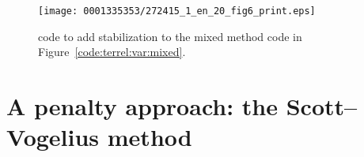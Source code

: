 \begin{figure}
\bwfig
\texttt{[image: 0001335353/272415\_1\_en\_20\_fig6\_print.eps]}
\caption{\ufl{} code to add stabilization to the mixed method
code in Figure~\ref{code:terrel:var:mixed}.}
\label{code:terrel:var:stab}\vspace*{4pt}
\end{figure}

\vspace*{3pt}
\section{A penalty approach: the Scott--Vogelius method}

